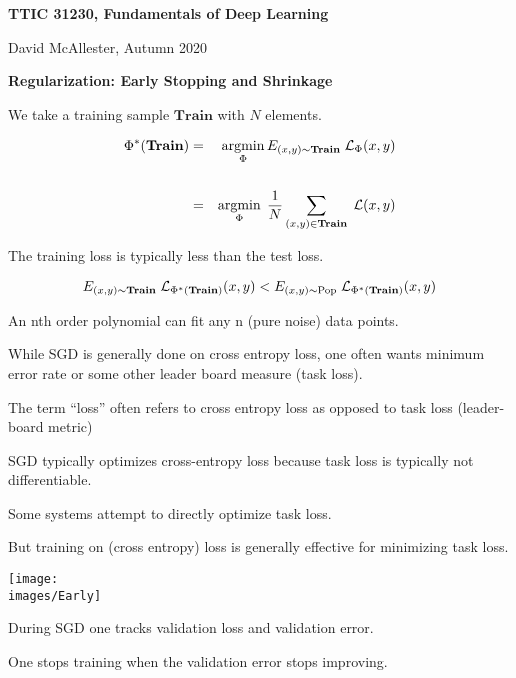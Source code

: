 





{\Huge


\centerline{\bf TTIC 31230, Fundamentals of Deep Learning}
\bigskip
\centerline{David McAllester, Autumn 2020}

\vfill
\centerline{\bf Regularization: Early Stopping and Shrinkage}
\vfill
\vfill


We take a training sample $\mathbf{Train}$ with $N$ elements.

\begin{eqnarray*}
\Phi^*(\mathbf{Train}) & = & \operatorname*{argmin}_\Phi E_{(x,y) \sim \mathbf{Train}}\;{\cal L}_\Phi(x,y) \\
\\
& = & \operatorname*{argmin}_\Phi \; \frac{1}{N} \sum_{(x,y)\in \mathbf{Train}}\; {\cal L}(x,y)
\end{eqnarray*}

\vfill
The training loss is typically less than the test loss.

\vfill
$$E_{(x,y) \sim \mathbf{Train}}\;{\cal L}_{\Phi^*(\mathbf{Train})}(x,y) < E_{(x,y) \sim \mathrm{Pop}}\; {\cal L}_{\Phi^*(\mathbf{Train})}(x,y)$$


An nth order polynomial can fit any n (pure noise) data points.


While SGD is generally done on cross entropy loss, one often wants minimum error rate or some other leader board measure (task loss).

\vfill
The term ``loss'' often refers to cross entropy loss as opposed to task loss (leader-board metric)

\vfill
SGD typically optimizes cross-entropy loss because task loss is typically not differentiable.

\vfill
Some systems attempt to directly optimize task loss.

\vfill
But training on (cross entropy) loss is generally effective for minimizing task loss.



\centerline{\texttt{[image: \\images/Early]}}

\vfill
During SGD one tracks validation loss and validation error.

\vfill
One stops training when the validation error stops improving.

}
